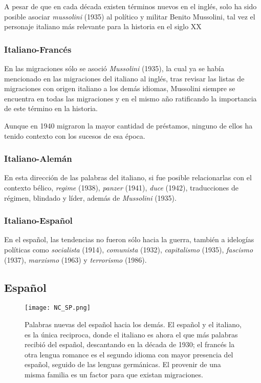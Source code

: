 {A pesar de que en cada década existen términos nuevos en el inglés, solo ha sido posible asociar \textit{mussolini} (1935) al político y militar Benito Mussolini, tal vez el personaje italiano más relevante para la historia en el siglo XX 

\subsubsection*{Italiano-Francés}%



En las migraciones sólo se asoció \textit{Mussolini} (1935), la cual ya se había mencionado en las migraciones del italiano al inglés, tras revisar las listas de migraciones con origen italiano  a los demás idiomas, Mussolini siempre se encuentra en todas las migraciones y en el mismo año ratificando la importancia de este término en la historia. 

Aunque en 1940 migraron la mayor cantidad de préstamos, ninguno de ellos ha tenido contexto con los sucesos de esa época. 

\subsubsection*{Italiano-Alemán}%

En esta dirección de las palabras del italiano, si fue posible relacionarlas con el contexto bélico,  \textit{regime} (1938), \textit{panzer} (1941), \textit{duce} (1942),  traducciones de régimen, blindado y líder, además de \textit{Mussolini} (1935). 



\subsubsection*{Italiano-Español}%

En el español, las tendencias no fueron sólo hacia la guerra, también a idelogías políticas como \textit{socialista} (1914), \textit{comunista} (1932), \textit{capitalismo} (1935), \textit{fascismo} (1937),  \textit{marxismo} (1963) y \textit{terrorismo} (1986). 



\subsection{Español}%

\begin{figure} %
	\centering
	\texttt{[image: NC\_SP.png]}
	\label{fig.NC_SP}
	\caption{Palabras nuevas del español hacia los demás. El español y el
	italiano, es la única reciproca, donde  el italiano es ahora el que más
	palabras recibió del español, descantando en la década de 1930; el
	francés la otra lengua romance es el segundo idioma con mayor presencia
	del español, seguido de las lenguas germánicas. El provenir de una
	misma familia es un factor para que existan migraciones.}
\end{figure} %

}
